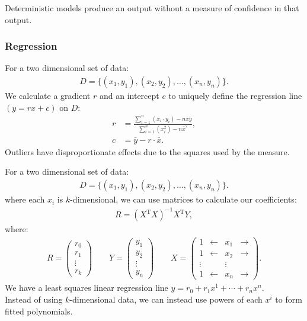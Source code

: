 Deterministic models produce an output without a measure of
confidence in that output.

\subsubsection{Regression}

For a two dimensional set of data: \begin{gather*}
    D = \{(x_1, y_1), (x_2, y_2), \ldots, (x_n, y_n)\}.
\end{gather*} We calculate a gradient $r$ and an intercept $c$ to 
uniquely define the regression line $(y = rx + c)$ on $D$: \begin{align*}
    r &= \frac{
        \sum_{i = 1}^n (x_i \cdot y_i) - n\bar{x}\bar{y}
    }{
        \sum_{i = 1}^n (x_i^2) - n\bar{x}^2
    }, \\
    c &= \bar{y} - r \cdot \bar{x}.
\end{align*} Outliers have disproportionate effects due to the
squares used by the measure. 

For a two dimensional set of data: 
\begin{gather*}
    D = \{(x_1, y_1), (x_2, y_2), \ldots, (x_n, y_n)\}.
\end{gather*} where each $x_i$ is $k$-dimensional,
we can use matrices to calculate our coefficients: \begin{gather*}
    R = (X^{\text{T}}X)^{-1}X^{\text{T}}Y,
\end{gather*} where: \begin{gather*}
    R = \begin{pmatrix}
        r_0 \\ r_1 \\ \vdots \\ r_k
    \end{pmatrix} 
    \qquad
    Y = \begin{pmatrix}
        y_1 \\ y_2 \\ \vdots \\ y_n
    \end{pmatrix}
    \qquad
    X = \begin{pmatrix}
        1      & \leftarrow & x_1    & \rightarrow \\
        1      & \leftarrow & x_2    & \rightarrow \\
        \vdots &            & \vdots &             \\
        1      & \leftarrow & x_n    & \rightarrow
    \end{pmatrix}.
\end{gather*} We have a least squares linear regression line
$y = r_0 + r_1x^1 + \cdots + r_nx^n$.
\\[\baselineskip]
Instead of using $k$-dimensional data, we can instead use
powers of each $x^i$ to form fitted polynomials.

